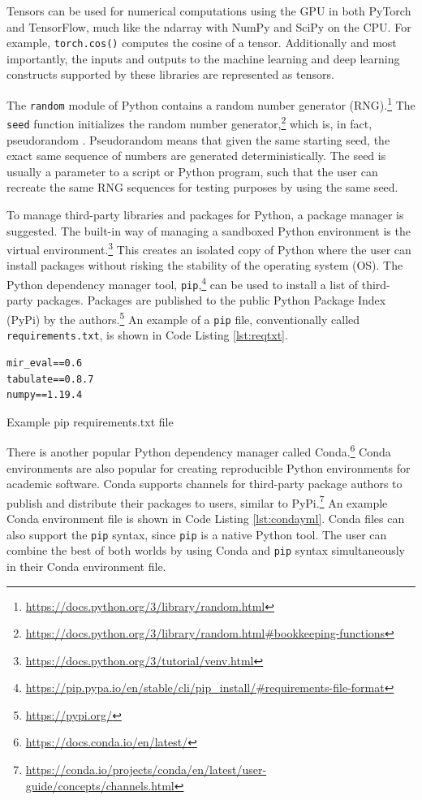\documentclass[report.tex]{subfiles}
\begin{document}
Tensors can be used for numerical computations using the GPU in both PyTorch and TensorFlow, much like the ndarray with NumPy and SciPy on the CPU. For example, \Verb#torch.cos()# computes the cosine of a tensor. Additionally and most importantly, the inputs and outputs to the machine learning and deep learning constructs supported by these libraries are represented as tensors.

The \Verb#random# module of Python contains a random number generator (RNG).\footnote{\url{https://docs.python.org/3/library/random.html}} The \Verb#seed# function initializes the random number generator,\footnote{\url{https://docs.python.org/3/library/random.html\#bookkeeping-functions}} which is, in fact, pseudorandom \parencite{pseudorng}. Pseudorandom means that given the same starting seed, the exact same sequence of numbers are generated deterministically. The seed is usually a parameter to a script or Python program, such that the user can recreate the same RNG sequences for testing purposes by using the same seed.

To manage third-party libraries and packages for Python, a package manager is suggested. The built-in way of managing a sandboxed Python environment is the virtual environment.\footnote{\url{https://docs.python.org/3/tutorial/venv.html}} This creates an isolated copy of Python where the user can install packages without risking the stability of the operating system (OS). The Python dependency manager tool, \Verb#pip#,\footnote{\url{https://pip.pypa.io/en/stable/cli/pip_install/\#requirements-file-format}} can be used to install a list of third-party packages. Packages are published to the public Python Package Index (PyPi) by the authors.\footnote{\url{https://pypi.org/}} An example of a \Verb#pip# file, conventionally called \Verb#requirements.txt#, is shown in Code Listing \ref{lst:reqtxt}.

\begin{listing}[ht]
\centering
\begin{BVerbatim}
mir_eval==0.6
tabulate==0.8.7
numpy==1.19.4
\end{BVerbatim}
	\caption{Example pip requirements.txt file}
	\label{lst:reqtxt}
\end{listing}

There is another popular Python dependency manager called Conda.\footnote{\url{https://docs.conda.io/en/latest/}} Conda environments are also popular for creating reproducible Python environments for academic software. Conda supports channels for third-party package authors to publish and distribute their packages to users, similar to PyPi.\footnote{\url{https://conda.io/projects/conda/en/latest/user-guide/concepts/channels.html}} An example Conda environment file is shown in Code Listing \ref{lst:condayml}. Conda files can also support the \Verb#pip# syntax, since \Verb#pip# is a native Python tool. The user can combine the best of both worlds by using Conda and \Verb#pip# syntax simultaneously in their Conda environment file.
\end{document}
